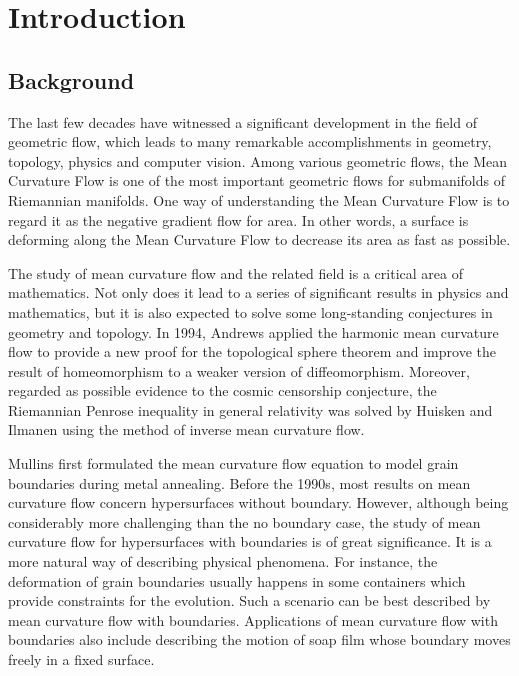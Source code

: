%

\chapter{Introduction}

\section{Background}

The last few decades have witnessed a significant development in the field of geometric flow, which leads to many remarkable accomplishments in geometry, topology, physics and computer vision. Among various geometric flows, the Mean Curvature Flow is one of the most important geometric flows for submanifolds of Riemannian manifolds. One way of understanding the Mean Curvature Flow is to regard it as the negative gradient flow for area. In other words, a surface is deforming along the Mean Curvature Flow to decrease its area as fast as possible.

The study of mean curvature flow and the related field is a critical area of mathematics. Not only does it lead to a series of significant results in physics and mathematics, but it is also expected to solve some long-standing conjectures in geometry and topology. In 1994, Andrews \cite{andrews_contraction_1994} applied the harmonic mean curvature flow to provide a new proof for the topological sphere theorem and improve the result of homeomorphism to a weaker version of diffeomorphism. Moreover, regarded as possible evidence to the cosmic censorship conjecture, the Riemannian Penrose inequality in general relativity was solved by Huisken and Ilmanen \cite{huisken_inverse_2001} using the method of inverse mean curvature flow.

Mullins \cite{mullins_twodimensional_1956} first formulated the mean curvature flow equation to model grain boundaries during metal annealing. Before the 1990s, most results on mean curvature flow concern hypersurfaces without boundary. However, although being considerably more challenging than the no boundary case, the study of mean curvature flow for hypersurfaces with boundaries is of great significance. It is a more natural way of describing physical phenomena. For instance, the deformation of grain boundaries usually happens in some containers which provide constraints for the evolution. Such a scenario can be best described by mean curvature flow with boundaries. Applications of mean curvature flow with boundaries also include describing the motion of soap film whose boundary moves freely in a fixed surface.

